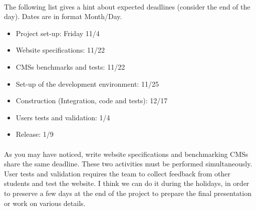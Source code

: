 \paragraph{} The following list gives a hint about expected deadlines (consider
the end of the day). Dates are in format Month/Day.

\begin{itemize}
	\item Project set-up: Friday 11/4
	\item Website specifications: 11/22
	\item CMSs benchmarks and tests: 11/22
	\item Set-up of the development environment: 11/25
	\item Construction (Integration, code and tests): 12/17
	\item Users tests and validation: 1/4
	\item Release: 1/9
\end{itemize}

\paragraph{} As you may have noticed, write website specifications and
benchmarking CMSs share the same deadline. These two activities must be
performed simultaneously. User tests and validation requires the team to collect
feedback from other students and test the website. I think we can do it during
the holidays, in order to preserve a few days at the end of the project to
prepare the final presentation or work on various details.
